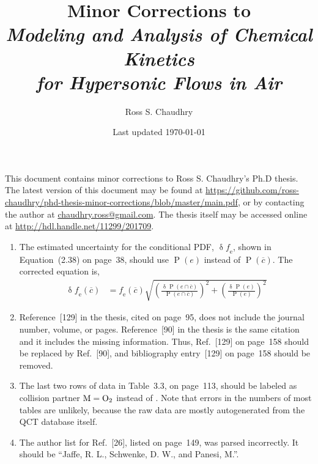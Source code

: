 \documentclass[11 pt]{article}
\title{Minor Corrections to \\
   \emph{Modeling and Analysis of Chemical Kinetics \\
         for Hypersonic Flows in Air} }
\author{Ross S. Chaudhry}
\date{Last updated \today}
\newcommand{\ol}{\overline}
\newcommand\myP{\operatorname{P}}
\newcommand\myerror{\operatorname{\delta}}
\newcommand\fe{\operatorname{\mathit{f}_e}}
\begin{document}
\maketitle

\noindent
This document contains minor corrections to Ross S. Chaudhry's Ph.D thesis.
The latest version of this document may be found at \url{https://github.com/ross-chaudhry/phd-thesis-minor-corrections/blob/master/main.pdf},
   or by contacting the author at \href{mailto:chaudhry.ross@gmail.com}{chaudhry.ross@gmail.com}.
The thesis itself may be accessed online at \url{http://hdl.handle.net/11299/201709}.


\begin{enumerate}

\item
The estimated uncertainty for the conditional PDF, $\myerror\fe$,
   shown in Equation~(2.38) on page~38, should use $\myP\left(e\right)$
   instead of $\myP\left(\ol{c}\right)$.
The corrected equation is,
%
\begin{align*}
   \myerror \fe\left(\ol{c}\right) &= \fe\left(\ol{c}\right) \sqrt{ \left(\frac{\myerror \myP\left(e \cap \ol{c}\right)}{\myP\left(e \cap \ol{c}\right)}\right)^2
                                                                  + \left(\frac{\myerror \myP\left(           e \right)}{\myP\left(           e \right)}\right)^2 }
\end{align*}

\item
Reference~[129] in the thesis, cited on page~95,
   does not include the journal number, volume, or pages.
Reference~[90] in the thesis is the same citation and it includes the missing information.
Thus, Ref.~[129] on page~158 should be replaced by Ref.~[90],
   and bibliography entry~[129] on page~158 should be removed.

\item
The last two rows of data in Table~3.3, on page~113, should be labeled as collision partner $\ce{M}=\ce{O2}$
   instead of .
Note that errors in the numbers of most tables are unlikely,
   because the raw data are mostly autogenerated from the QCT database itself.

\item
The author list for Ref.~[26], listed on page~149, was parsed incorrectly.
It should be ``Jaffe, R. L., Schwenke, D. W., and Panesi, M.''.

% 

\end{enumerate}
\end{document}

